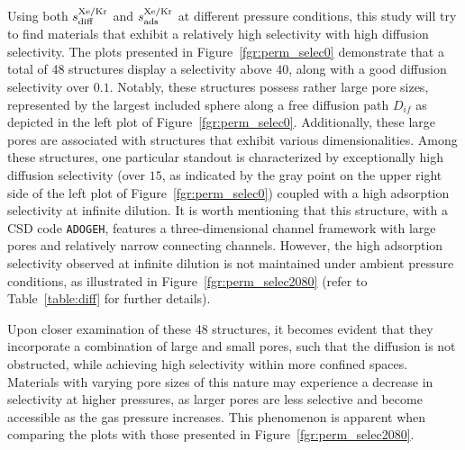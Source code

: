 \documentclass[main]{subfiles}
\begin{document}
Using both $s^{\text{Xe/Kr}}_{\text{diff}}$ and $s^{\text{Xe/Kr}}_{\text{ads}}$ at different pressure conditions, this study will try to find materials that exhibit a relatively high selectivity with high diffusion selectivity. The plots presented in Figure~\ref{fgr:perm_selec0} demonstrate that a total of 48 structures display a selectivity above $40$, along with a good diffusion selectivity over $0.1$. Notably, these structures possess rather large pore sizes, represented by the largest included sphere along a free diffusion path $D_{if}$ as depicted in the left plot of Figure~\ref{fgr:perm_selec0}. Additionally, these large pores are associated with structures that exhibit various dimensionalities. Among these structures, one particular standout is characterized by exceptionally high diffusion selectivity (over $15$, as indicated by the gray point on the upper right side of the left plot of Figure~\ref{fgr:perm_selec0}) coupled with a high adsorption selectivity at infinite dilution. It is worth mentioning that this structure, with a CSD code \texttt{ADOGEH}\cite{Peikert_2012}, features a three-dimensional channel framework with large pores and relatively narrow connecting channels. However, the high adsorption selectivity observed at infinite dilution is not maintained under ambient pressure conditions, as illustrated in Figure~\ref{fgr:perm_selec2080} (refer to Table~\ref{table:diff} for further details).

Upon closer examination of these 48 structures, it becomes evident that they incorporate a combination of large and small pores, such that the diffusion is not obstructed, while achieving high selectivity within more confined spaces. Materials with varying pore sizes of this nature may experience a decrease in selectivity at higher pressures, as larger pores are less selective and become accessible as the gas pressure increases. This phenomenon is apparent when comparing the plots with those presented in Figure~\ref{fgr:perm_selec2080}.
\end{document}
